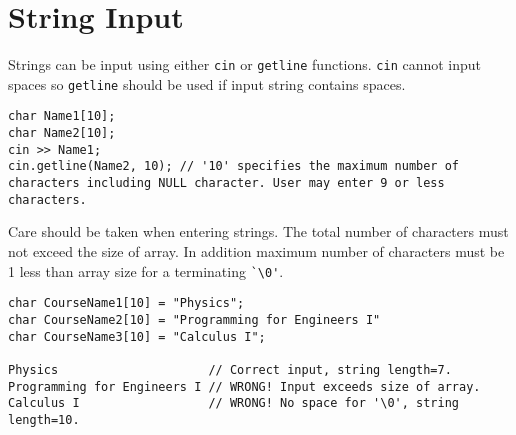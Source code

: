 \documentclass[12pt,a4paper]{article}
\begin{document}
\section{String Input}
Strings can be input using either \texttt{cin} or \texttt{getline} functions. \texttt{cin} cannot input spaces so \texttt{getline} should be used if input string contains spaces.
\begin{lstlisting}[caption={String Input}]
char Name1[10];
char Name2[10];
cin >> Name1;
cin.getline(Name2, 10); // '10' specifies the maximum number of characters including NULL character. User may enter 9 or less characters.
\end{lstlisting}

Care should be taken when entering strings. The total number of characters must not exceed the size of array. In addition maximum number of characters must be 1 less than array size for a terminating \verb|`\0'|.
\begin{lstlisting}
char CourseName1[10] = "Physics";
char CourseName2[10] = "Programming for Engineers I"
char CourseName3[10] = "Calculus I";

Physics                     // Correct input, string length=7.
Programming for Engineers I // WRONG! Input exceeds size of array.
Calculus I                  // WRONG! No space for '\0', string length=10.
\end{lstlisting}
\end{document}
